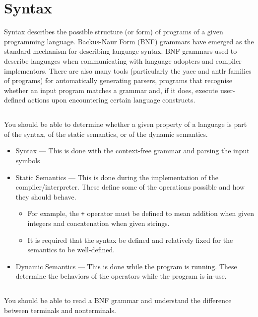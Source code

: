 \section{Syntax}\label{sec:Syntax}
Syntax describes the possible structure (or form) of programs of a given programming language.
Backus-Naur Form (BNF) grammars have emerged as the standard mechanism for describing language syntax.
BNF grammars used to describe languages when communicating with language adopters and compiler implementors.
There are also many tools (particularly the yacc and antlr families of programs) for automatically generating parsers, programs that recognise whether an input program matches a grammar and, if it does, execute user-defined actions upon encountering certain language constructs.

\subsection{}
You should be able to determine whether a given property of a language is part of the syntax, of the static semantics, or of the dynamic semantics.

\begin{itemize}
\item Syntax --- This is done with the context-free grammar and parsing the input symbols
\item Static Semantics --- This is done during the implementation of the compiler/interpreter. These define some of the operations possible and how they should behave.
  \begin{itemize}[noitemsep]
  \item For example, the \texttt{+} operator must be defined to mean addition when given integers and concatenation when given strings.
  \item It is required that the syntax be defined and relatively fixed for the semantics to be well-defined.
  \end{itemize}

\item Dynamic Semantics --- This is done while the program is running. These determine the behaviors of the operators while the program is in-use.
\end{itemize}

\subsection{}
You should be able to read a BNF grammar and understand the difference between terminals and nonterminals.

